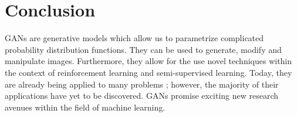 \documentclass[11pt]{article}
\begin{document}
\section{Conclusion}
GANs are generative models which allow us to parametrize complicated probability distribution functions. They can be used to generate, modify and manipulate images. Furthermore, they allow for the use novel techniques within the context of reinforcement learning and semi-supervised learning. Today, they are already being applied to many problems \citep{genmodelingopenai}; however, the majority of their applications have yet to be discovered. GANs promise exciting new research avenues within the field of machine learning.



\end{document}
